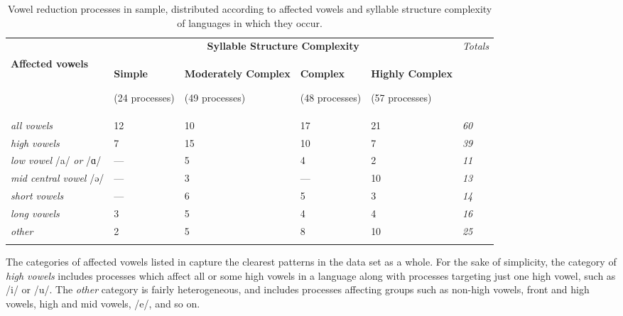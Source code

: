 \begin{table}
\begin{tabularx}{\textwidth}{XXXXXX}
\lsptoprule
 & \multicolumn{4}{c}{ \textbf{Syllable Structure Complexity}} & \textit{Totals}\\
 \textbf{Affected vowels} & { \textbf{Simple}}

 (24 processes) & { \textbf{Moderately Complex}}

 (49 processes) & { \textbf{Complex}}

 (48 processes) & { \textbf{Highly Complex}}

 (57 processes) & \\
 \textit{all vowels} & 12 & 10 & 17 & 21 & \textit{60}\\
 \textit{high vowels} & 7 & 15 & 10 & 7 & \textit{39}\\
 \textit{low vowel} /a/ \textit{or} /ɑ/ & — & 5 & 4 & 2 & \textit{11}\\
 \textit{mid central vowel} /ə/ & — & 3 & — & 10 & \textit{13}\\
 \textit{short vowels} & — & 6 & 5 & 3 & \textit{14}\\
 \textit{long vowels} & 3 & 5 & 4 & 4 & \textit{16}\\
 \textit{other} & 2 & 5 & 8 & 10 & \textit{25}\\
\lspbottomrule
\end{tabularx}
\caption{\label{tab:6.4}Vowel reduction processes in sample, distributed according to affected vowels and syllable structure complexity of languages in which they occur.}
\end{table}

The categories of affected vowels listed in  capture the clearest patterns in the data set as a whole. For the sake of simplicity, the category of \textit{high vowels} includes processes which affect all or some high vowels in a language along with processes targeting just one high vowel, such as /i/ or /u/. The \textit{other} category is fairly heterogeneous, and includes processes affecting groups such as non-high vowels, front and high vowels, high and mid vowels, /e/, and so on.

